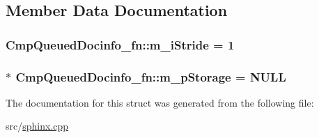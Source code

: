 \subsection{Member Data Documentation}
\hypertarget{structCmpQueuedDocinfo__fn_a611448819879df87ba30432fcc93e17d}{
\subsubsection[{m\-\_\-i\-Stride}]{ Cmp\-Queued\-Docinfo\-\_\-fn\-::m\-\_\-i\-Stride = 1\hspace{0.3cm}{\ttfamily [static]}}}\label{structCmpQueuedDocinfo__fn_a611448819879df87ba30432fcc93e17d}
\hypertarget{structCmpQueuedDocinfo__fn_a781c9290079e8bfb3c95e7c9aecd7931}{
\subsubsection[{m\-\_\-p\-Storage}]{ $\ast$ Cmp\-Queued\-Docinfo\-\_\-fn\-::m\-\_\-p\-Storage = N\-U\-L\-L\hspace{0.3cm}{\ttfamily [static]}}}\label{structCmpQueuedDocinfo__fn_a781c9290079e8bfb3c95e7c9aecd7931}


The documentation for this struct was generated from the following file\-:\begin{DoxyCompactItemize}
\item 
src/\hyperlink{sphinx_8cpp}{sphinx.\-cpp}\end{DoxyCompactItemize}
